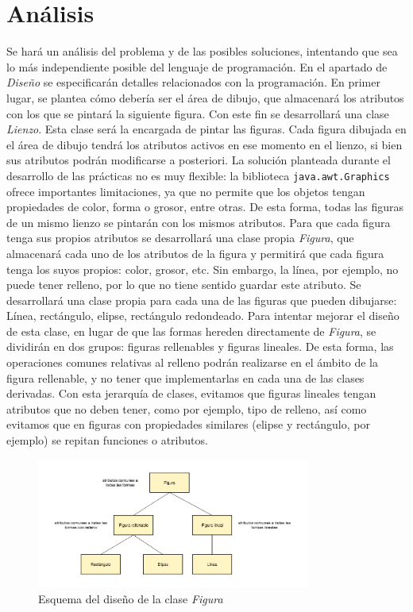 \section{Análisis}
Se hará un análisis del problema y de las posibles soluciones, intentando que sea lo más independiente posible del lenguaje de programación. En el apartado de \textit{Diseño} se especificarán detalles relacionados con la programación.
\vskip0.3cm
En primer lugar, se plantea cómo debería ser el área de dibujo, que almacenará los atributos con los que se pintará la siguiente figura. Con este fin se desarrollará una clase \textit{Lienzo}. Esta clase será la encargada de pintar las figuras. Cada figura dibujada en el área de dibujo tendrá los atributos activos en ese momento en el lienzo, si bien sus atributos podrán modificarse a posteriori.
\vskip0.3cm
La solución planteada durante el desarrollo de las prácticas no es muy flexible: la biblioteca \texttt{java.awt.Graphics} ofrece importantes limitaciones, ya que no permite que los objetos tengan propiedades de color, forma o grosor, entre otras. De esta forma, todas las figuras de un mismo lienzo se pintarán con los mismos atributos.
\vskip0.3cm
Para que cada figura tenga sus propios atributos se desarrollará una clase propia \textit{Figura}, que almacenará cada uno de los atributos de la figura y permitirá que cada figura tenga los suyos propios: color, grosor, etc. Sin embargo, la línea, por ejemplo, no puede tener relleno, por lo que no tiene sentido guardar este atributo. Se desarrollará una clase propia para cada una de las figuras que pueden dibujarse: Línea, rectángulo, elipse, rectángulo redondeado.
\vskip0.3cm
Para intentar mejorar el diseño de esta clase, en lugar de que las formas hereden directamente de \textit{Figura}, se dividirán en dos grupos: figuras rellenables y figuras lineales. De esta forma, las operaciones comunes relativas al relleno podrán realizarse en el ámbito de la figura rellenable, y no tener que implementarlas en cada una de las clases derivadas. Con esta jerarquía de clases, evitamos que figuras lineales tengan atributos que no deben tener, como por ejemplo, tipo de relleno, así como evitamos que en figuras con propiedades similares (elipse y rectángulo, por ejemplo) se repitan funciones o atributos.
\vskip0.3cm
\begin{figure}[H]
 \centering
  \includegraphics[width=0.8\textwidth]{esquemaFormas.png}
 \caption{Esquema del diseño de la clase \textit{Figura}}
 \label{diseño}
 \end{figure}
